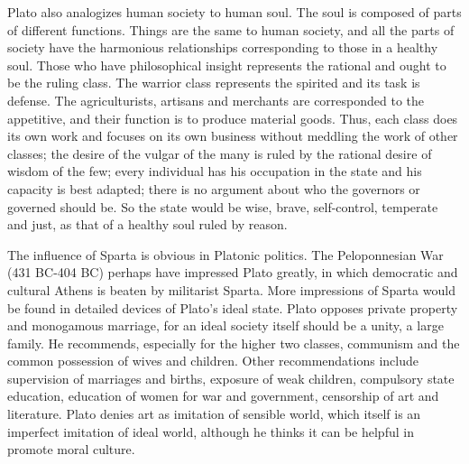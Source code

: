 \documentclass[11pt]{article}
\begin{document}
\newline

Plato also analogizes human society to human soul. 
The soul is composed of parts of different functions. 
Things are the same to human society, and all the parts of society have the harmonious relationships corresponding to those in a healthy soul. 
Those who have philosophical insight represents the rational and ought to be the ruling class. 
The warrior class represents the spirited and its task is defense. 
The agriculturists, artisans and merchants are corresponded to the appetitive, and their function is to produce material goods. 
Thus, each class does its own work and focuses on its own business without meddling the work of other classes; 
the desire of the vulgar of the many is ruled by the rational desire of wisdom of the few; 
every individual has his occupation in the state and his capacity is best adapted; 
there is no argument about who the governors or governed should be. 
So the state would be wise, brave, self-control, temperate and just, as that of a healthy soul ruled by reason.

\newline

The influence of Sparta is obvious in Platonic politics. 
The Peloponnesian War (431 BC-404 BC) perhaps have impressed Plato greatly, in which democratic and cultural Athens is beaten by militarist Sparta. 
More impressions of Sparta would be found in detailed devices of Plato’s ideal state. 
Plato opposes private property and monogamous marriage, for an ideal society itself should be a unity, a large family. 
He recommends, especially for the higher two classes, communism and the common possession of wives and children. 
Other recommendations include supervision of marriages and births, exposure of weak children, compulsory state education, education of women for war and government, censorship of art and literature. 
Plato denies art as imitation of sensible world, which itself is an imperfect imitation of ideal world, although he thinks it can be helpful in promote moral culture.

\newline
\end{document}
